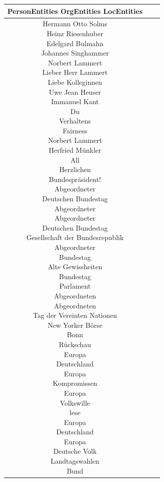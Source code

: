\documentclass[a4paper,11pt]{article}
\begin{document}
\begin{table}[ht]
\centering
\begin{tabular}{||c | c | c||}
\hline
PersonEntities  OrgEntities  LocEntities \\ 

\hline\hline
\makecell{Hermann Otto Solms \\
Heinz Riesenhuber \\
Edelgard Bulmahn \\
Johannes Singhammer \\
Norbert Lammert \\
Lieber Herr Lammert \\
Liebe Kolleginnen \\
Uwe Jean Heuser \\
Immanuel Kant \\
Du \\
Verhaltens \\
Fairness \\
Norbert Lammert \\
Herfried Münkler \\
All \\
Herzlichen \\
} 
\makecell{Bundespräsident! \\
Abgeordneter \\
Deutschen Bundestag \\
Abgeordneter \\
Abgeordneter \\
Deutschen Bundestag \\
Gesellschaft der Bundesrepublik \\
Abgeordneter \\
Bundestag \\
Alte Gewissheiten \\
Bundestag \\
Parlament \\
Abgeordneten \\
Abgeordneten \\
Tag der Vereinten Nationen \\
New Yorker Börse \\
} 
\makecell{Bonn \\
Rückschau \\
Europa \\
Deutschland \\
Europa \\
Kompromissen \\
Europa \\
Volkswille \\
lese \\
Europa \\
Deutschland \\
Europa \\
Deutsche Volk \\
Landtagswahlen \\
Bund \\
}\\
\hline
\end{tabular}
\end{table}
\clearpage
\end{document}
